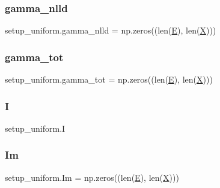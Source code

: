 \mbox{\label{namespacesetup__uniform_a44260e72d1b0aedebe1d2abaa4152fc8}} 
\subsubsection{\texorpdfstring{gamma\+\_\+nlld}{gamma\_nlld}}
{\footnotesize\ttfamily setup\+\_\+uniform.\+gamma\+\_\+nlld = np.\+zeros((len(\hyperlink{namespacesetup__uniform_a05accd2e8ab1c28d2f58f024c9a64fac}{E}), len(\hyperlink{namespacesetup__uniform_a6d0e53624e475055c31146a2ff8d762c}{X})))}

\mbox{\label{namespacesetup__uniform_a97a31bde0b5b39e0201b03dc03f0e1df}} 
\subsubsection{\texorpdfstring{gamma\+\_\+tot}{gamma\_tot}}
{\footnotesize\ttfamily setup\+\_\+uniform.\+gamma\+\_\+tot = np.\+zeros((len(\hyperlink{namespacesetup__uniform_a05accd2e8ab1c28d2f58f024c9a64fac}{E}), len(\hyperlink{namespacesetup__uniform_a6d0e53624e475055c31146a2ff8d762c}{X})))}

\mbox{\label{namespacesetup__uniform_a3417d7bb0276f50626b6893f5ee95051}} 
\subsubsection{\texorpdfstring{I}{I}}
{\footnotesize\ttfamily setup\+\_\+uniform.\+I}

\mbox{\label{namespacesetup__uniform_ae054ccd61b2c6164e2714796fbc97616}} 
\subsubsection{\texorpdfstring{Im}{Im}}
{\footnotesize\ttfamily setup\+\_\+uniform.\+Im = np.\+zeros((len(\hyperlink{namespacesetup__uniform_a05accd2e8ab1c28d2f58f024c9a64fac}{E}), len(\hyperlink{namespacesetup__uniform_a6d0e53624e475055c31146a2ff8d762c}{X})))}

